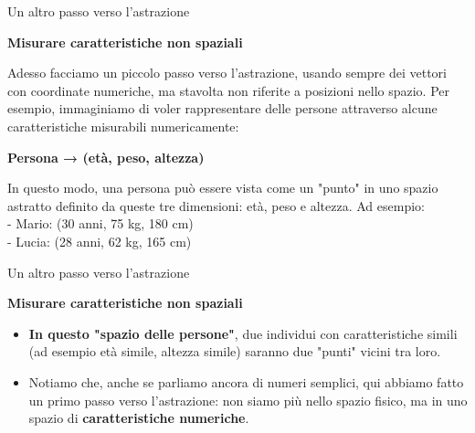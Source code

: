 \documentclass[aspectratio=169]{beamer}
\begin{document}
%
%
\begin{frame}{Un altro passo verso l'astrazione}

\textbf{Misurare caratteristiche non spaziali}\\
\vspace{0.5cm}

Adesso facciamo un piccolo passo verso l'astrazione, usando sempre dei vettori con coordinate numeriche, ma stavolta non riferite a posizioni nello spazio. Per esempio, immaginiamo di voler rappresentare delle persone attraverso alcune caratteristiche misurabili numericamente:\\
\vspace{.3cm}
\begin{center}
\textbf{Persona → (età, peso, altezza)}\\
\end{center}
\vspace{.3cm}
In questo modo, una persona può essere vista come un "punto" in uno spazio astratto definito da queste tre dimensioni: età, peso e altezza. Ad esempio:\\
\vspace{.3cm}
- Mario: (30 anni, 75 kg, 180 cm)\\
- Lucia: (28 anni, 62 kg, 165 cm)

\end{frame}
%
%
\begin{frame}{Un altro passo verso l'astrazione}

\textbf{Misurare caratteristiche non spaziali}\\
\vspace{0.5cm}
\begin{itemize}
\item \textbf{In questo "spazio delle persone"}, due individui con caratteristiche simili (ad esempio età simile, altezza simile) saranno due "punti" vicini tra loro.
\vspace{.3cm}
\item Notiamo che, anche se parliamo ancora di numeri semplici, qui abbiamo fatto un primo passo verso l'astrazione: non siamo più nello spazio fisico, ma in uno spazio di \textbf{caratteristiche numeriche}.
\end{itemize}
\end{frame}
%
%
\end{document}
